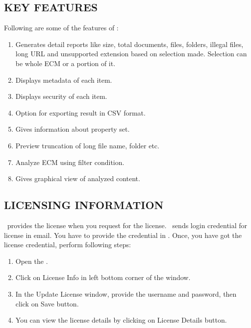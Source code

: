 \subsection{KEY FEATURES}
Following are some of the features of \appName:
\\
\begin{enumerate}
  \item Generates detail reports like size, total documents, files, folders, illegal files, long URL and unsupported extension based on selection made. Selection can be whole ECM or a portion of it.
  \item Displays metadata of each item.
  \item Displays security of each item.
  \item Option for exporting result in CSV format.
  \item Gives information about property set.
  \item Preview truncation of long file name, folder etc.
  \item Analyze ECM using filter condition.
  \item Gives graphical view of analyzed content.
\end{enumerate}
\subsection{LICENSING INFORMATION}
\compName\ provides the license when you request for the license. \compName\ sends login credential for license in email. You have to provide the credential in \appName. Once, you have got the license credential, perform following steps:
\\
\begin{enumerate}
\item	Open the \appName.
\item	Click on License Info in left bottom corner of the window.
\item	In the Update License window, provide the username and password, then click on Save button.
\item	You can view the license details by clicking on License Details button.
\end{enumerate}


